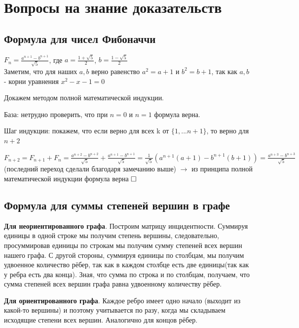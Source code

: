 \documentclass[a4paper, 10pt]{article}
\begin{document}
\section{Вопросы на знание доказательств}


\subsection{Формула для чисел Фибоначчи}

$F_n = \frac{a^{n + 1} - b^{n + 1}}{\sqrt{5}}$, где $a = \frac{1 + \sqrt{5}}{2}$, $b = \frac{1 - \sqrt{5}}{2}$ \\

Заметим, что для наших $a, b$ верно равенство $a^2 = a + 1$ и $b^2 = b + 1$, так как $a, b$ -  корни уравнения $x^2 - x -  1 = 0$


Докажем методом полной математической индукции. 

База: нетрудно проверить, что при $n = 0$ и $n = 1$ формула верна.


Шаг индукции: покажем, что если верно для всех k от $\{1, ... n + 1 \}$, то верно для $n + 2$ 


$\displaystyle F_{n + 2} = F_{n + 1} + F_n = \frac{a^{n + 2} - b^{n + 2}}{\sqrt{5}} + \frac{a^{n + 1} - b^{n + 1}}{\sqrt{5}} = \frac{1}{\sqrt{5}}(a^{n + 1}(a + 1) - b^{n + 1}(b + 1)) = \frac{a^{n + 3} - b^{n + 3}}{\sqrt{5}}$(последний переход сделали благодаря замечанию выше) $\to$ из принципа полной математической индукции формула верна $\hfill \square$



\subsection{Формула для суммы степеней вершин в графе}

\textbf{Для неориентированного графа}. Построим матрицу инцидентности. Суммируя единицы в одной строке мы получим степень вершины, следовательно, просуммировав единицы по строкам мы получим сумму степеней всех вершин нашего графа. С другой стороны, суммируя единицы по столбцам, мы получим удвоенное количество рёбер, так как в каждом столбце есть две единицы(так как у ребра есть два конца). Зная, что сумма по строка и по столбцам, получаем, что сумма степеней всех вершин графа равна удвоенному количеству рёбер.

\textbf{Для ориентированного графа}. Каждое ребро имеет одно начало (выходит из какой-то вершины) и поэтому учитывается по разу, когда мы складываем исходящие степени всех вершин. Аналогично для концов рёбер.
\end{document}
